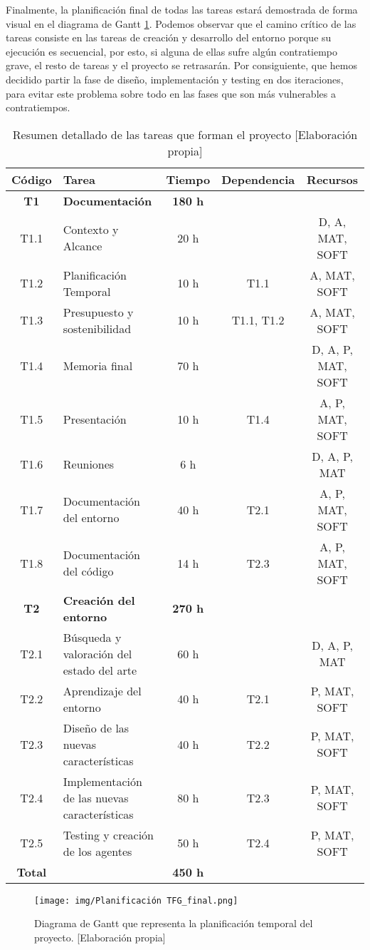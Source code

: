 Finalmente, la planificación final de todas las tareas estará demostrada de forma visual en el diagrama de Gantt \ref{fig:gantt}. Podemos observar que el camino crítico de las tareas consiste en las tareas de creación y desarrollo del entorno porque su ejecución es secuencial, por esto, si alguna de ellas sufre algún contratiempo grave, el resto de tareas y el proyecto se retrasarán. Por consiguiente, que hemos decidido partir la fase de diseño, implementación y testing en dos iteraciones, para evitar este problema sobre todo en las fases que son más vulnerables a contratiempos.
\begin{table}[t]
    \begin{center}
        \begin{tabular}{| c | l | c | c | c |}
        \hline
        \textbf{Código} & \textbf{Tarea} & \textbf{Tiempo} & \textbf{Dependencia} & \textbf{Recursos} \\ \hline
        \textbf{T1} & \textbf{Documentación} & \textbf{180 h} & & \\ \hline
        T1.1 & Contexto y Alcance & 20 h & & D, A, MAT, SOFT \\
        T1.2 & Planificación Temporal & 10 h & T1.1 & A, MAT, SOFT \\
        T1.3 & Presupuesto y sostenibilidad & 10 h & T1.1, T1.2 & A, MAT, SOFT \\
        T1.4 & Memoria final & 70 h &  & D, A, P, MAT, SOFT \\
        T1.5 & Presentación & 10 h & T1.4 & A, P, MAT, SOFT \\
        T1.6 & Reuniones & 6 h & & D, A, P, MAT \\ 
        T1.7 & Documentación del entorno & 40 h & T2.1 & A, P, MAT, SOFT \\ 
        T1.8 & Documentación del código & 14 h & T2.3 & A, P, MAT, SOFT \\ 
        \hline
        \textbf{T2} & \textbf{Creación del entorno} & \textbf{270 h} & &  \\ \hline
        T2.1 & Búsqueda y valoración del estado del arte & 60 h & & D, A, P, MAT \\
        T2.2 & Aprendizaje del entorno & 40 h & T2.1 & P, MAT, SOFT \\
        T2.3 & Diseño de las nuevas características & 40 h & T2.2 & P, MAT, SOFT \\
        T2.4 & Implementación de las nuevas características & 80 h & T2.3 & P, MAT, SOFT \\
        T2.5 & Testing y creación de los agentes & 50 h & T2.4 & P, MAT, SOFT \\
         \hline
         \textbf{Total} & & \textbf{450 h} & & \\
         \hline
        \end{tabular}
        \caption{Resumen detallado de las tareas que forman el proyecto [Elaboración propia]}
        \label{tab:planificacion-tareas}
    \end{center}
\end{table}
\begin{figure}
    \texttt{[image: img/Planificación TFG\_final.png]}
    \caption{Diagrama de Gantt que representa la planificación temporal del proyecto. [Elaboración propia]}
     \label{fig:gantt}
\end{figure}

